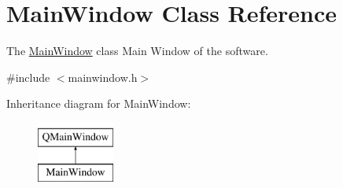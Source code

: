 \hypertarget{classMainWindow}{\section{Main\+Window Class Reference}
\label{classMainWindow}
}


The \hyperlink{classMainWindow}{Main\+Window} class Main Window of the software.  




{\ttfamily \#include $<$mainwindow.\+h$>$}

Inheritance diagram for Main\+Window\+:\begin{figure}[H]
\begin{center}
\leavevmode
\includegraphics[height=2.000000cm]{d6/d1a/classMainWindow}
\end{center}
\end{figure}
